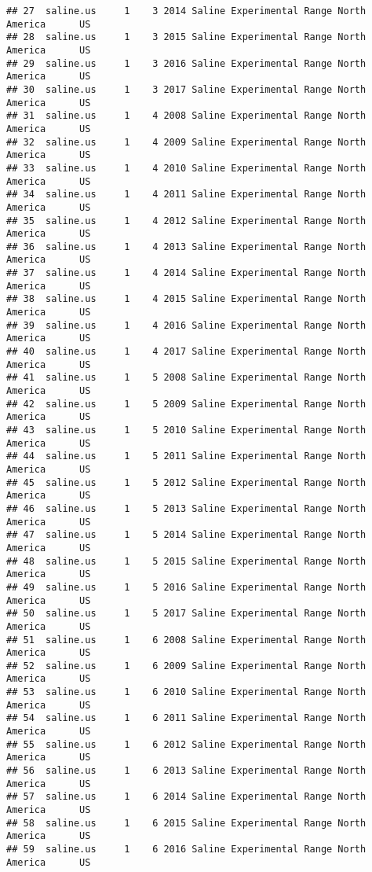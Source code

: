 \documentclass[]{article}
\begin{document}
\begin{verbatim}
## 27  saline.us     1    3 2014 Saline Experimental Range North America      US
## 28  saline.us     1    3 2015 Saline Experimental Range North America      US
## 29  saline.us     1    3 2016 Saline Experimental Range North America      US
## 30  saline.us     1    3 2017 Saline Experimental Range North America      US
## 31  saline.us     1    4 2008 Saline Experimental Range North America      US
## 32  saline.us     1    4 2009 Saline Experimental Range North America      US
## 33  saline.us     1    4 2010 Saline Experimental Range North America      US
## 34  saline.us     1    4 2011 Saline Experimental Range North America      US
## 35  saline.us     1    4 2012 Saline Experimental Range North America      US
## 36  saline.us     1    4 2013 Saline Experimental Range North America      US
## 37  saline.us     1    4 2014 Saline Experimental Range North America      US
## 38  saline.us     1    4 2015 Saline Experimental Range North America      US
## 39  saline.us     1    4 2016 Saline Experimental Range North America      US
## 40  saline.us     1    4 2017 Saline Experimental Range North America      US
## 41  saline.us     1    5 2008 Saline Experimental Range North America      US
## 42  saline.us     1    5 2009 Saline Experimental Range North America      US
## 43  saline.us     1    5 2010 Saline Experimental Range North America      US
## 44  saline.us     1    5 2011 Saline Experimental Range North America      US
## 45  saline.us     1    5 2012 Saline Experimental Range North America      US
## 46  saline.us     1    5 2013 Saline Experimental Range North America      US
## 47  saline.us     1    5 2014 Saline Experimental Range North America      US
## 48  saline.us     1    5 2015 Saline Experimental Range North America      US
## 49  saline.us     1    5 2016 Saline Experimental Range North America      US
## 50  saline.us     1    5 2017 Saline Experimental Range North America      US
## 51  saline.us     1    6 2008 Saline Experimental Range North America      US
## 52  saline.us     1    6 2009 Saline Experimental Range North America      US
## 53  saline.us     1    6 2010 Saline Experimental Range North America      US
## 54  saline.us     1    6 2011 Saline Experimental Range North America      US
## 55  saline.us     1    6 2012 Saline Experimental Range North America      US
## 56  saline.us     1    6 2013 Saline Experimental Range North America      US
## 57  saline.us     1    6 2014 Saline Experimental Range North America      US
## 58  saline.us     1    6 2015 Saline Experimental Range North America      US
## 59  saline.us     1    6 2016 Saline Experimental Range North America      US

\end{verbatim}
\end{document}
